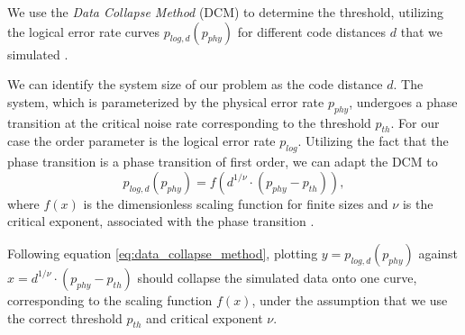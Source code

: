 We use the \emph{Data Collapse Method} (DCM) to determine the threshold, utilizing the logical error rate curves $p_{log,d}(p_{phy})$ for different code distances $d$ that we simulated \cite{pyfssa}.

We can identify the system size of our problem as the code distance $d$.
The system, which is parameterized by the physical error rate $p_{phy}$, undergoes a phase transition at the critical noise rate corresponding to the threshold $p_{th}$.
For our case the order parameter is the logical error rate $p_{log}$. 
Utilizing the fact that the phase transition is a phase transition of first order, we can adapt the DCM to 
\begin{equation}
    p_{log,d}(p_{phy}) = f\left( d^{1/\nu} \cdot(p_{phy}-p_{th})\right),
    \label{eq:data_collapse_method}
\end{equation}
where $f(x)$ is the dimensionless scaling function for finite sizes and $\nu$ is the critical exponent, associated with the phase transition \cite{pyfssa}. 

Following equation \ref{eq:data_collapse_method}, plotting $y=p_{log,d}(p_{phy})$ against $x=d^{1/\nu} \cdot(p_{phy}-p_{th})$ should collapse the simulated data onto one curve, corresponding to the scaling function $f(x)$, 
under the assumption that we use the correct threshold $p_{th}$ and critical exponent $\nu$.

